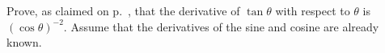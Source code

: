 Prove, as claimed on p.~\pageref{transcendental-table}, that the derivative
of $\tan\theta$ with respect to $\theta$ is $(\cos \theta)^{-2}$. Assume that the
derivatives of the sine and cosine are already known.
